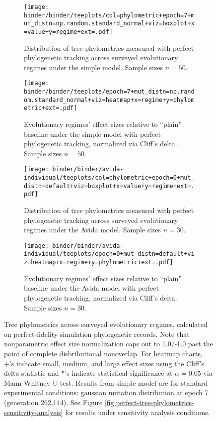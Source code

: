 \begin{figure*}
  \centering
  \begin{subfigure}[b]{\textwidth}
    \texttt{[image: binder/binder/teeplots/col=phylometric+epoch=7+mut\_distn=np.random.standard\_normal+viz=boxplot+x=value+y=regime+ext=.pdf]}
  \caption{%
    Distribution of tree phylometrics measured with perfect phylogenetic tracking across surveyed evolutionary regimes under the simple model.
    Sample sizes $n=50$.
  }
  \label{fig:perfect-tree-phylometrics-simple-boxplot}
  \end{subfigure}

  \begin{subfigure}[b]{\textwidth}
    \texttt{[image: binder/binder/teeplots/epoch=7+mut\_distn=np.random.standard\_normal+viz=heatmap+x=regime+y=phylometric+ext=.pdf]}
    \caption{
    Evolutionary regimes' effect sizes relative to ``plain'' baseline under the simple model with perfect phylogenetic tracking, normalized via Cliff's delta.
    Sample sizes $n=50$.
    }
\label{fig:perfect-tree-phylometrics-simple-heatmap}
  \end{subfigure}%

\begin{subfigure}[b]{\textwidth}
  \texttt{[image: binder/binder/avida-individual/teeplots/col=phylometric+epoch=0+mut\_distn=default+viz=boxplot+x=value+y=regime+ext=.pdf]}
  \caption{
  Distribution of tree phylometrics measured with perfect phylogenetic tracking across surveyed evolutionary regimes under the Avida model.
  Sample sizes $n=30$.
  }
  \label{fig:perfect-tree-phylometrics-avida-boxplot}
\end{subfigure}%

\begin{subfigure}[b]{\textwidth}
  \texttt{[image: binder/binder/avida-individual/teeplots/epoch=0+mut\_distn=default+viz=heatmap+x=regime+y=phylometric+ext=.pdf]}
\caption{%
  Evolutionary regimes' effect sizes relative to ``plain'' baseline under the Avida model with perfect phylogenetic tracking, normalized via Cliff's delta.
    Sample sizes $n=30$.
}
\label{fig:perfect-tree-phylometrics-avida-heatmap}
\end{subfigure}

  \caption{%
  Tree phylometrics across surveyed evolutionary regimes, calculated on perfect-fidelity simulation phylogenetic records.
  Note that nonparametric effect size normalization caps out to 1.0/-1.0 past the point of complete disbributional nonoverlap.
  For heatmap charts, +'s indicate small, medium, and large effect sizes using the Cliff's delta statistic and *'s indicate statistical significance at $\alpha = 0.05$ via Mann-Whitney U test.
  Results from simple model are for standard experimental conditions: gaussian mutation distribution at epoch 7 (generation 262,144).
  See Figure \ref{fig:perfect-tree-phylometrics-sensitivity-analysis} for results under sensitivity analysis conditions.
  }
  \label{fig:perfect-tree-phylometrics}
\end{figure*}